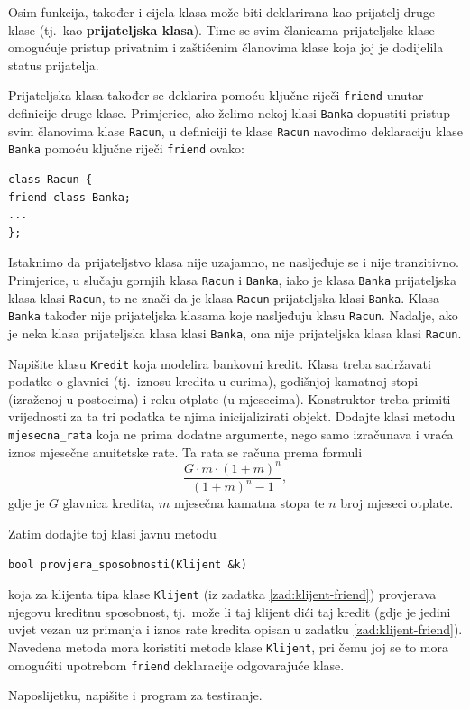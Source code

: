 Osim funkcija, također i cijela klasa može biti deklarirana kao prijatelj druge klase (tj.\ kao \textbf{prijateljska klasa}). 
Time se svim članicama prijateljske klase omogućuje pristup privatnim i zaštićenim članovima klase koja joj je dodijelila status prijatelja.
\medskip

Prijateljska klasa također se deklarira pomoću ključne riječi \texttt{friend} unutar definicije druge klase.
Primjerice, ako želimo nekoj klasi \texttt{Banka}
dopustiti pristup svim članovima klase \texttt{Racun},
u definiciji te klase \texttt{Racun}
navodimo deklaraciju klase \texttt{Banka} pomoću ključne riječi \texttt{friend} ovako:
\begin{verbatim}
class Racun {
friend class Banka;
...
};
\end{verbatim}


Istaknimo da prijateljstvo klasa nije uzajamno, ne nasljeđuje se i nije tranzitivno.
Primjerice, u slučaju gornjih klasa \texttt{Racun} i \texttt{Banka}, iako je klasa \texttt{Banka}
prijateljska klasa klasi \texttt{Racun},
to ne znači da je klasa \texttt{Racun} prijateljska
klasi \texttt{Banka}.
Klasa \texttt{Banka} također nije prijateljska
klasama koje nasljeđuju klasu \texttt{Racun}.
Nadalje,
ako je neka klasa prijateljska klasa klasi \texttt{Banka},
ona nije prijateljska klasa klasi \texttt{Racun}.


\begin{zadatak}\label{zad:kredit}
    Napišite klasu \texttt{Kredit} koja modelira bankovni kredit. 
    Klasa treba sadržavati podatke
    o glavnici (tj.\ iznosu kredita u eurima),
    godišnjoj kamatnoj stopi (izraženoj u postocima)
    i roku otplate (u mjesecima).
    Konstruktor treba primiti vrijednosti za 
    ta tri podatka te njima inicijalizirati objekt.
    Dodajte klasi metodu \texttt{mjesecna\_rata}
    koja ne prima dodatne argumente, nego samo izračunava i vraća 
    iznos mjesečne anuitetske rate.
    Ta rata se računa prema formuli
    $$\frac{G\cdot m\cdot(1+m)^n}{(1+m)^n-1},$$
    gdje je $G$ glavnica kredita, $m$ mjesečna kamatna stopa
    te $n$ broj mjeseci otplate.
    \medskip

    Zatim dodajte toj klasi javnu metodu 
    \begin{center}
        \texttt{bool provjera\_sposobnosti(Klijent \&k)}
    \end{center}
    koja za klijenta tipa klase \texttt{Klijent}
    (iz zadatka \ref{zad:klijent-friend})
    provjerava njegovu kreditnu sposobnost,
    tj.\ može li taj klijent dići taj kredit
    (gdje je jedini uvjet vezan uz primanja i iznos rate kredita opisan u zadatku \ref{zad:klijent-friend}).
    Navedena metoda mora koristiti metode klase \texttt{Klijent},
    pri čemu joj se to mora omogućiti upotrebom \texttt{friend} deklaracije odgovarajuće klase.
    \medskip

    Naposlijetku, napišite i program za testiranje.
\end{zadatak}


